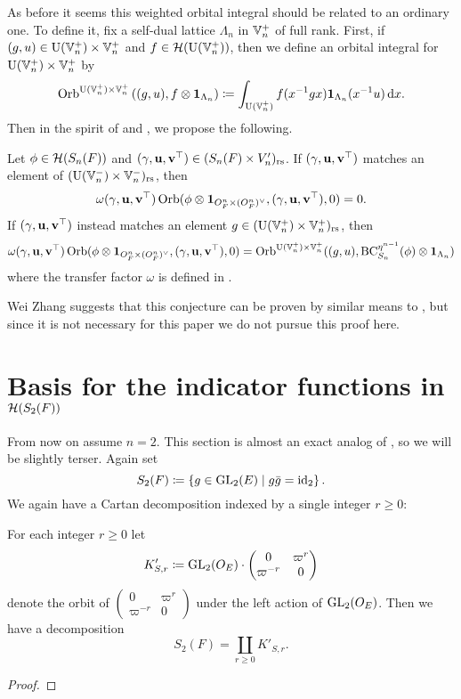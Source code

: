 As before it seems this weighted orbital integral should be related to an ordinary one.
To define it, fix a self-dual lattice $\Lambda_n$ in $\mathbb V_n^+$ of full rank.
First, if $(g,u) \in \operatorname{U}(\mathbb V_n^+) \times \mathbb V_n^+$ and $f \in \mathcal H(\operatorname{U}(\mathbb V_n^+))$,
then we define an orbital integral for $\operatorname{U}(\mathbb V_n^+) \times \mathbb V_n^+$ by
\begin{equation}
  \Orb^{\U(\VV_n^+) \times \VV_n^+}\left( (g,u), f \otimes \mathbf{1}_{\Lambda_n} \right)
  \coloneqq \int_{\U(\VV_n^+)} f(x\inv g x) \mathbf{1}_{\Lambda_n}(x^{-1} u) \odif x.
  \label{eq:unweighted_orbital_semi_lie}
\end{equation}
Then in the spirit of \cite[Conjecture 1.9]{ref:liuFJ}
and , we propose the following.
\begin{conjecture}
  \label{conj:rel_fundamental_lemma_semilie}
  Let $\phi \in \mathcal H(S_n(F))$ and ${(\gamma, \mathbf u, \mathbf v^\top)} \in (S_n(F) \times V_n')_{\mathrm{rs}}$.
  If ${(\gamma, \mathbf u, \mathbf v^\top)}$ matches an element of $(\operatorname{U}(\mathbb V_n^-) \times \mathbb V_n^-)_{\mathrm{rs}}$, then
  \[ \omega{(\gamma, \mathbf u, \mathbf v^\top)} \operatorname{Orb}(\phi \otimes \mathbf{1}_{O_F^n \times (O_F^n)^\vee}, {(\gamma, \mathbf u, \mathbf v^\top)}, 0) = 0. \]
  If ${(\gamma, \mathbf u, \mathbf v^\top)}$ instead matches an element $g \in (\operatorname{U}(\mathbb V_n^+) \times \mathbb V_n^+)_{\mathrm{rs}}$, then
  \[ \omega{(\gamma, \mathbf u, \mathbf v^\top)} \operatorname{Orb}(\phi \otimes \mathbf{1}_{O_F^n \times (O_F^n)^\vee}, {(\gamma, \mathbf u, \mathbf v^\top)}, 0)
    = \operatorname{Orb}^{\operatorname{U}(\mathbb V_n^+) \times \mathbb V_n^+}((g,u), \operatorname{BC}^{\eta^{n-1}}_{S_n}(\phi) \otimes \mathbf{1}_{\Lambda_n}) \]
  where the transfer factor $\omega$ is defined in .
\end{conjecture}
Wei Zhang suggests that this conjecture can be proven by similar means
to ,
but since it is not necessary for this paper we do not pursue this proof here.

\section{Basis for the indicator functions in $\mathcal H(S_2(F))$}
\label{sec:hecke_basis_FJ}
From now on assume $n = 2$.
This section is almost an exact analog of ,
so we will be slightly terser.
Again set
\[ S_2(F) \coloneqq \left\{ g \in \operatorname{GL}_2(E) \mid g \bar{g} = \operatorname{id}_2 \right\}. \]
We again have a Cartan decomposition indexed by a single integer $r \ge 0$:
\begin{lemma}
  For each integer $r \ge 0$ let
  \[ K'_{S,r} \coloneqq \operatorname{GL}_2(O_E) \cdot
    \begin{pmatrix} 0 & \varpi^r \\ \varpi^{-r} & 0 \end{pmatrix} \]
  denote the orbit of
  $\begin{pmatrix} 0 & \varpi^r \\ \varpi^{-r} & 0 \end{pmatrix}$
  under the left action of $\operatorname{GL}_2(O_E)$.
  Then we have a decomposition
  \[ S_2(F) = \coprod_{r \geq 0} K'_{S,r}. \]
\end{lemma}
\begin{proof}
\end{proof}

